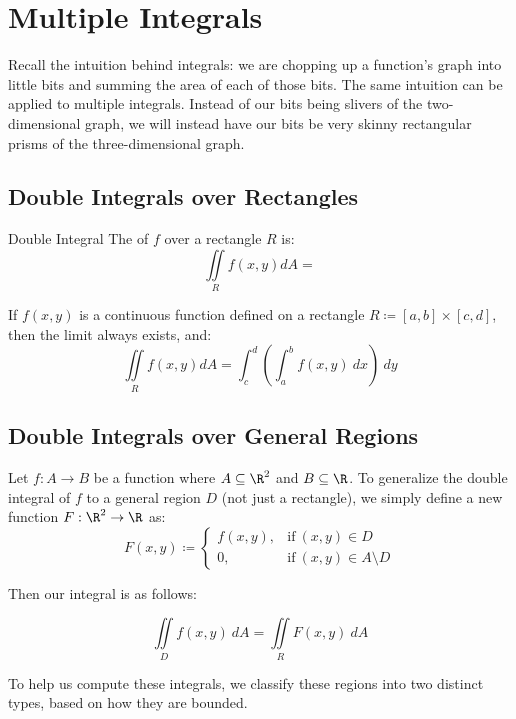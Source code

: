 \chapter{Multiple Integrals}


Recall the intuition behind integrals: we are chopping up a function's graph into little bits and summing the area of each of those bits. The same intuition can be applied to multiple integrals. Instead of our bits being slivers of the two-dimensional graph, we will instead have our bits be very skinny rectangular prisms of the three-dimensional graph.

\section{Double Integrals over Rectangles}

\begin{dfnbox}{Double Integral}{}
    The  of $f$ over a rectangle $R$ is:
    \[ \iint\limits_R f(x,y) dA =  \]
\end{dfnbox}

\begin{thmbox}{}{}
    If $f(x,y)$ is a continuous function defined on a rectangle $R \coloneq [a,b] \times [c,d]$, then the limit always exists, and:
    \[ \iint\limits_R f(x,y) dA = \int_c^d \left( \int_a^b f(x,y)\ dx \right)\ dy \]
\end{thmbox}

\section{Double Integrals over General Regions}
Let $f : A \to B$ be a function where $A \subseteq \R^2$ and $B \subseteq \R$. To generalize the double integral of $f$ to a general region $D$ (not just a rectangle), we simply define a new function $F : \R^2 \to \R$ as:
\[ F(x,y) \coloneq \begin{cases}
    f(x,y), & \text{if}\ (x,y) \in D \\
    0, & \text{if}\ (x,y) \in A \setminus D
\end{cases}\]

Then our integral is as follows:

\[ \iint\limits_D f(x,y)\ dA = \iint\limits_R F(x,y)\ dA \]

To help us compute these integrals, we classify these regions into two distinct types, based on how they are bounded.

